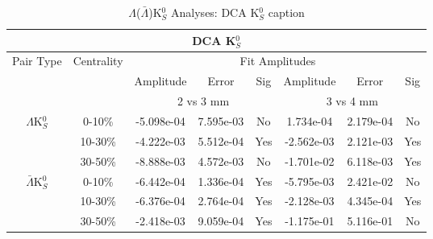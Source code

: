 \documentclass[../AnalysisNoteJBuxton.tex]{subfiles}
\begin{document}
\begin{table}
 \centering
 \begin{tabular}{|c|c|c|c|c||c|c|c|}
  \multicolumn{8}{c}{DCA K$^{0}_{S}$} \\
  \hline
  \multirow{3}{*}{Pair Type} & \multirow{3}{*}{Centrality} & \multicolumn{6}{c|}{Fit Amplitudes} \\
  \cline{3-8}
   & & Amplitude & Error & Sig & Amplitude & Error & Sig \\  
  \cline{3-8}
   & & \multicolumn{3}{c||}{2 vs 3 mm} & \multicolumn{3}{c|}{3 vs 4 mm} \\  
  \hline  
  \multirow{3}{*}{$\Lambda$K$^{0}_{S}$}  
   &  0-10\% & -5.098e-04 & 7.595e-03 & No & 1.734e-04 & 2.179e-04 & No \\
   & 10-30\% & -4.222e-03 & 5.512e-04 & Yes & -2.562e-03 & 2.121e-03 & Yes \\
   & 30-50\% & -8.888e-03 & 4.572e-03 & No & -1.701e-02 & 6.118e-03 & Yes \\
  \hline  
  \multirow{3}{*}{$\bar{\Lambda}$K$^{0}_{S}$}  
   &  0-10\% & -6.442e-04 & 1.336e-04 & Yes & -5.795e-03 & 2.421e-02 & No \\
   & 10-30\% & -6.376e-04 & 2.764e-04 & Yes & -2.128e-03 & 4.345e-04 & Yes \\
   & 30-50\% & -2.418e-03 & 9.059e-04 & Yes & -1.175e-01 & 5.116e-01 & No \\
  \hline
 \end{tabular}
 \caption{$\Lambda$($\bar{\Lambda}$)K$^{0}_{S}$ Analyses: DCA K$^{0}_{S}$ caption}
 \label{tab:K0DcaLamK0}
\end{table}
\end{document}
